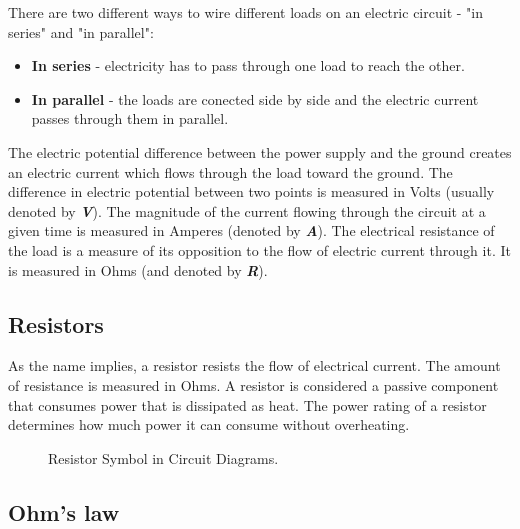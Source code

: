 There are two different ways to wire different loads on an electric circuit - "in series" and "in parallel":
\begin{itemize}
    \item \textbf{In series} - electricity has to pass through one load to reach the other.
    \item \textbf{In parallel} - the loads are conected side by side and the electric current passes through them in parallel.
\end{itemize}

The electric potential difference between the power supply and the ground creates an
electric current which flows through the load toward the ground. The difference
in electric potential between two points is measured in Volts (usually denoted
by \textbf{\textit{V}}). The magnitude of the current flowing through the circuit at a
given time is measured in Amperes (denoted by \textbf{\textit{A}}). The
electrical resistance of the load is a measure of its opposition to the flow of
electric current through it. It is measured in Ohms (and denoted by
\textbf{\textit{R}}).

\subsection{Resistors}

As the name implies, a resistor resists the flow of electrical current. The
amount of resistance is measured in Ohms. A resistor is considered a passive
component that consumes power that is dissipated as heat. The power rating of a
resistor determines how much power it can consume without overheating.

\begin{figure}[!ht]
    \centering
    
    \caption{Resistor Symbol in Circuit Diagrams.} \label{fig:resistor}
\end{figure}

\subsection{Ohm's law}

